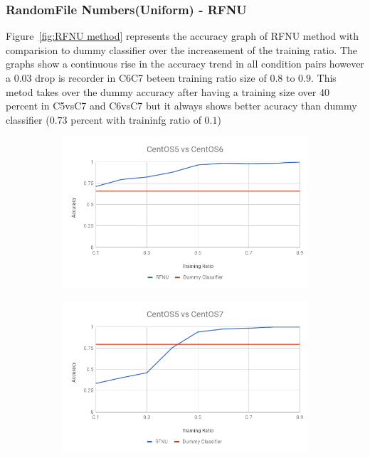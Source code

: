 \documentclass[10pt, conference, compsocconf]{IEEEtran}
\begin{document}
\subsubsection{RandomFile Numbers(Uniform) - RFNU}
Figure~\ref{fig:RFNU method} represents
the accuracy graph of RFNU method with comparision to dummy
classifier over the increasement of the training ratio.
The graphs show a continuous rise in the accuracy trend in all condition pairs however a 0.03 drop is recorder in C6C7 beteen training ratio size of $0.8$ to $0.9$. This metod takes over the dummy accuracy after having a training size over 40 percent in C5vsC7 and C6vsC7 but it always shows better acuracy than dummy classifier ($0.73$ percent with traininfg ratio of $0.1$)    
\begin{figure}[h!]
        \centering
        \begin{subfigure}[b]{0.8\linewidth}
                \includegraphics[width=\columnwidth]{figures/ALS/RFNU-ALS-5vs6-PFS}
        \end{subfigure}
        \begin{subfigure}[b]{0.8\linewidth}
                \includegraphics[width=\columnwidth]{figures/ALS/RFNU-ALS-5vs7-PFS}

\end{subfigure}
\end{figure}
\end{document}
